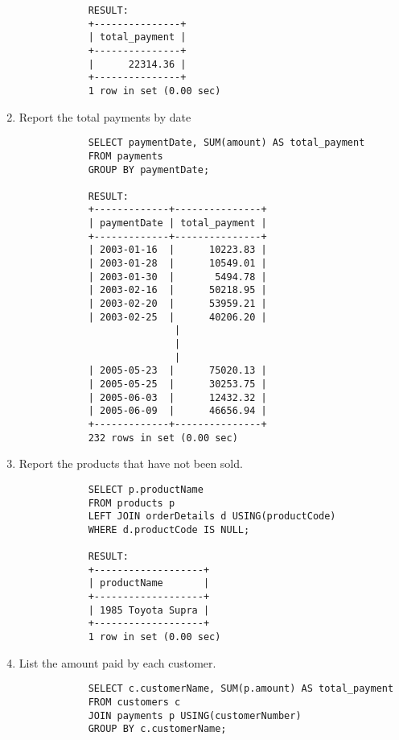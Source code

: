 \documentclass{article}
\begin{document}
\begin{enumerate}
\begin{verbatim}
			RESULT:
			+---------------+
			| total_payment |
			+---------------+
			|      22314.36 |
			+---------------+
			1 row in set (0.00 sec)
			\end{verbatim}
		\item Report the total payments by date
			\begin{verbatim}
			SELECT paymentDate, SUM(amount) AS total_payment
			FROM payments
			GROUP BY paymentDate;
			
			RESULT:
			+-------------+---------------+
			| paymentDate | total_payment |
			+-------------+---------------+
			| 2003-01-16  |      10223.83 |
			| 2003-01-28  |      10549.01 |
			| 2003-01-30  |       5494.78 |
			| 2003-02-16  |      50218.95 |
			| 2003-02-20  |      53959.21 |
			| 2003-02-25  |      40206.20 |
			               |
			               |
			               |
			| 2005-05-23  |      75020.13 |
			| 2005-05-25  |      30253.75 |
			| 2005-06-03  |      12432.32 |
			| 2005-06-09  |      46656.94 |
			+-------------+---------------+
			232 rows in set (0.00 sec)
			\end{verbatim}
		\item Report the products that have not been sold.
			\begin{verbatim}
			SELECT p.productName
			FROM products p
			LEFT JOIN orderDetails d USING(productCode)
			WHERE d.productCode IS NULL;
			
			RESULT:
			+-------------------+
			| productName       |
			+-------------------+
			| 1985 Toyota Supra |
			+-------------------+
			1 row in set (0.00 sec)
			\end{verbatim}
		\item List the amount paid by each customer.
			\begin{verbatim}
			SELECT c.customerName, SUM(p.amount) AS total_payment
			FROM customers c
			JOIN payments p USING(customerNumber)
			GROUP BY c.customerName;
			

\end{verbatim}
\end{enumerate}
\end{document}
